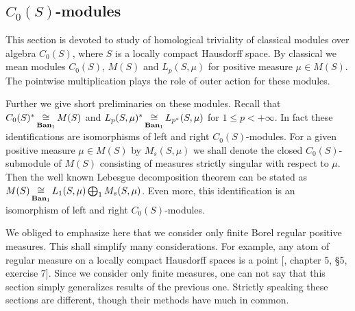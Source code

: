 
\subsection{\texorpdfstring{$C_0(S)$}{C0(S)}-modules}
\label{SubSectionC0SModules}

This section is devoted to study of homological triviality of classical modules over algebra $C_0(S)$, where $S$ is a locally compact Hausdorff space. By classical we mean modules $C_0(S)$, $M(S)$ and $L_p(S,\mu)$ for positive measure $\mu\in M(S)$. The pointwise multiplication plays the role of outer action for these modules.

Further we give short preliminaries on these modules. Recall that $C_0(S)^*\mathop{\mathbin{\cong}}\limits_{\mathbf{Ban}_1}M(S)$ and $L_p(S,\mu)^*\mathop{\mathbin{\cong}}\limits_{\mathbf{Ban}_1}L_{p^*}(S,\mu)$ for $1\leq p<+\infty$. In fact these identifications are isomorphisms of left and right $C_0(S)$-modules. For a given positive measure $\mu\in M(S)$ by $M_s(S,\mu)$ we shall denote the closed $C_0(S)$-submodule of $M(S)$ consisting of measures strictly singular with respect to $\mu$. Then the well known Lebesgue decomposition theorem can be stated as $M(S)\mathop{\mathbin{\cong}}\limits_{\mathbf{Ban}_1}L_1(S,\mu)\bigoplus_1 M_s(S,\mu)$. Even more, this identification is an isomorphism of left and right $C_0(S)$-modules. 

We obliged to emphasize here that we consider only finite Borel regular positive measures. This shall simplify many considerations. For example, any atom of regular measure on a locally compact Hausdorff spaces is a point [\cite{BourbElemMathIntegLivVI}, chapter 5, \S 5, exercise 7]. Since we consider only finite measures, one can not say that this section simply generalizes results of the previous one. Strictly speaking these sections are different, though their methods have much in common.

